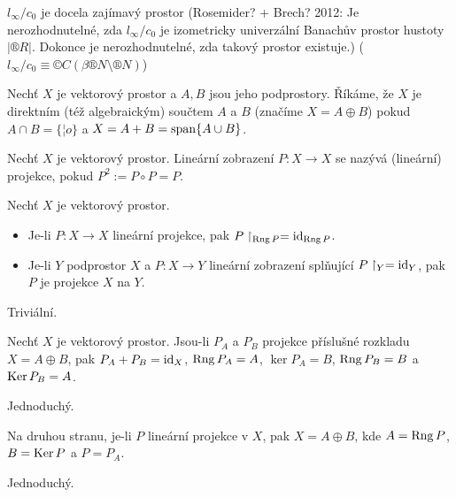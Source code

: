 \documentclass[12pt]{article}					%
\begin{document}
\begin{poznamka}[Zajímavosti]
	$l_∞ / c_0$ je docela zajímavý prostor (Rosemider? + Brech? 2012: Je nerozhodnutelné, zda $l_∞ / c_0$ je izometricky univerzální Banachův prostor hustoty $|®R|$. Dokonce je nerozhodnutelné, zda takový prostor existuje.) ($l_∞ / c_0 ≡ ©C(\beta ®N \setminus ®N)$)
\end{poznamka}

\begin{definice}
	Nechť $X$ je vektorový prostor a $A, B$ jsou jeho podprostory. Říkáme, že $X$ je direktním (též algebraickým) součtem $A$ a $B$ (značíme $X = A \oplus B$) pokud $A \cap B = \{¦o\}$ a $X = A + B = \operatorname{span}\{A \cup B\}$.
\end{definice}

\begin{definice}[Projekce]
	Nechť $X$ je vektorový prostor. Lineární zobrazení $P: X \rightarrow X$ se nazývá (lineární) projekce, pokud $P^2 := P \circ P = P$.
\end{definice}

\begin{tvrzeni}[Fakt]
	Nechť $X$ je vektorový prostor.

	\begin{itemize}
		\item Je-li $P: X \rightarrow X$ lineární projekce, pak $P\upharpoonright_{\operatorname{Rng} P} = \operatorname{id}_{\operatorname{Rng} P}$.
		\item Je-li $Y$ podprostor $X$ a $P: X \rightarrow Y$ lineární zobrazení splňující $P\upharpoonright_Y = \operatorname{id}_Y$, pak $P$ je projekce $X$ na $Y$.
	\end{itemize}

	\begin{dukazin}
		Triviální.
	\end{dukazin}
\end{tvrzeni}

\begin{tvrzeni}
	Nechť $X$ je vektorový prostor. Jsou-li $P_A$ a $P_B$ projekce příslušné rozkladu $X = A \oplus B$, pak $P_A + P_B = \operatorname{id}_X$, $\operatorname{Rng} P_A = A$, $\ker P_A = B$, $\operatorname{Rng} P_B = B$ a $\operatorname{Ker} P_B = A$.

	\begin{dukazin}
		Jednoduchý.
	\end{dukazin}

	Na druhou stranu, je-li $P$ lineární projekce v $X$, pak $X = A \oplus B$, kde $A = \operatorname{Rng} P$, $B = \operatorname{Ker} P$ a $P = P_A$.

	\begin{dukazin}
		Jednoduchý.
	\end{dukazin}
\end{tvrzeni}
\end{document}
